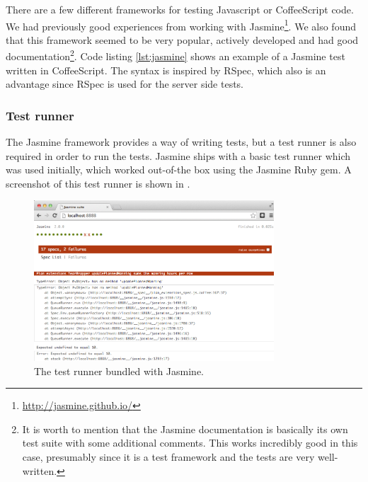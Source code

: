 
There are a few different frameworks for testing Javascript or
CoffeeScript code. We had previously good experiences from working with
Jasmine\footnote{\url{http://jasmine.github.io/}}. We also found that
this framework seemed to be very popular, actively developed and had
good documentation\footnote{It is worth to mention that the Jasmine
documentation is basically its own test suite with some additional
comments. This works incredibly good in this case, presumably since it
is a test framework and the tests are very well-written.}. Code listing
\ref{lst:jasmine} shows an example of a Jasmine test written in
CoffeeScript. The syntax is inspired by RSpec, which also is an
advantage since RSpec is used for the server side tests.\\

\subsubsection{Test runner}
The Jasmine framework provides a way of writing tests, but a test runner
is also required in order to run the tests. Jasmine ships with a basic
test runner which was used initially, which worked out-of-the box using
the Jasmine Ruby gem. A screenshot of this test runner is shown in
.\\

\begin{figure}
\centering
\includegraphics[width=0.8\textwidth]{results/choices/jasmine_runner}
\caption{The test runner bundled with Jasmine.}
\label{fig:jasmine_runner}
\end{figure}

